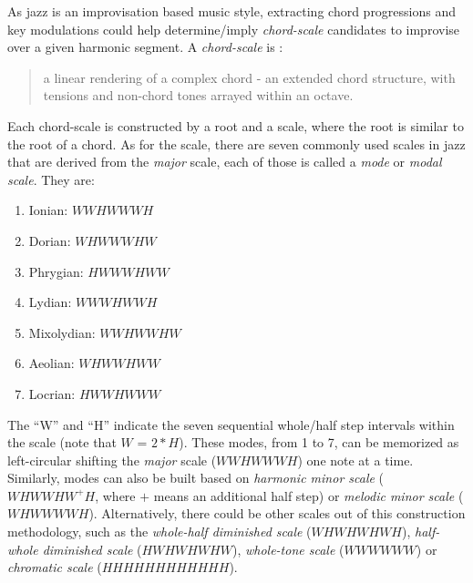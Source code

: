 As jazz is an improvisation based music style, extracting chord progressions and key modulations could help determine/imply {\it chord-scale} candidates to improvise over a given harmonic segment. A {\it chord-scale} is \cite{hojnackijazz}:
\begin{quote}
a linear rendering of a complex chord - an extended chord structure, with tensions and non-chord tones arrayed within an octave.
\end{quote}
Each chord-scale is constructed by a root and a scale, where the root is similar to the root of a chord. As for the scale, there are seven commonly used scales in jazz that are derived from the \textit{major} scale, each of those is called a {\it mode} or {\it modal scale}. They are:
\begin{enumerate}
\item Ionian: $WWHWWWH$
\item Dorian: $WHWWWHW$
\item Phrygian: $HWWWHWW$
\item Lydian: $WWWHWWH$
\item Mixolydian: $WWHWWHW$
\item Aeolian: $WHWWHWW$
\item Locrian: $HWWHWWW$
\end{enumerate}
The ``W'' and ``H'' indicate the seven sequential whole/half step intervals within the scale (note that $W$ = $2*H$). These modes, from 1 to 7, can be memorized as left-circular shifting the \textit{major} scale ($WWHWWWH$) one note at a time. Similarly, modes can also be built based on {\it harmonic minor scale} ($WHWWHW^+H$, where $+$ means an additional half step) or {\it melodic minor scale} ($WHWWWWH$). Alternatively, there could be other scales out of this construction methodology, such as the {\it whole-half diminished scale} ($WHWHWHWH$), {\it half-whole diminished scale} ($HWHWHWHW$), {\it whole-tone scale} ($WWWWWW$) or {\it chromatic scale} ($HHHHHHHHHHHH$).


